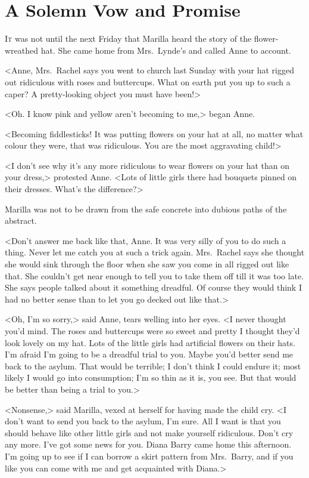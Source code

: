 \chapter{A Solemn Vow and Promise}

\lettrine[]{I}{t} was not until the next Friday that Marilla heard the story of the flower-wreathed hat. She came home from Mrs.~Lynde's and called Anne to account.

\zz
<Anne, Mrs.~Rachel says you went to church last Sunday with your hat rigged out ridiculous with roses and buttercups. What on earth put you up to such a caper? A pretty-looking object you must have been!>

<Oh. I know pink and yellow aren't becoming to me,> began Anne.

<Becoming fiddlesticks! It was putting flowers on your hat at all, no matter what colour they were, that was ridiculous. You are the most aggravating child!>

<I don't see why it's any more ridiculous to wear flowers on your hat than on your dress,> protested Anne. <Lots of little girls there had bouquets pinned on their dresses. What's the difference?>

Marilla was not to be drawn from the safe concrete into dubious paths of the abstract.

<Don't answer me back like that, Anne. It was very silly of you to do such a thing. Never let me catch you at such a trick again. Mrs.~Rachel says she thought she would sink through the floor when she saw you come in all rigged out like that. She couldn't get near enough to tell you to take them off till it was too late. She says people talked about it something dreadful. Of course they would think I had no better sense than to let you go decked out like that.>

<Oh, I'm so sorry,> said Anne, tears welling into her eyes. <I never thought you'd mind. The roses and buttercups were so sweet and pretty I thought they'd look lovely on my hat. Lots of the little girls had artificial flowers on their hats. I'm afraid I'm going to be a dreadful trial to you. Maybe you'd better send me back to the asylum. That would be terrible; I don't think I could endure it; most likely I would go into consumption; I'm so thin as it is, you see. But that would be better than being a trial to you.>

<Nonsense,> said Marilla, vexed at herself for having made the child cry. <I don't want to send you back to the asylum, I'm sure. All I want is that you should behave like other little girls and not make yourself ridiculous. Don't cry any more. I've got some news for you. Diana Barry came home this afternoon. I'm going up to see if I can borrow a skirt pattern from Mrs.~Barry, and if you like you can come with me and get acquainted with Diana.>


